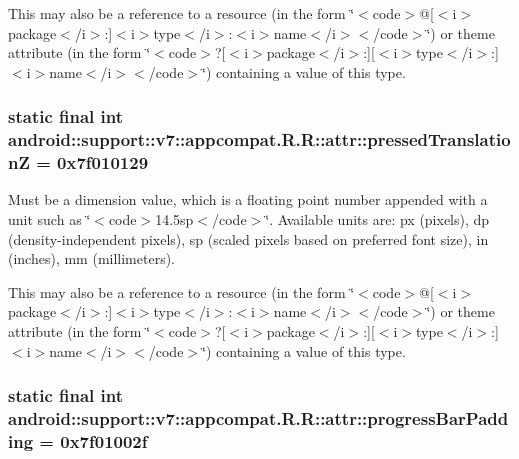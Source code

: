 This may also be a reference to a resource (in the form \char`\"{}$<$code$>$@\mbox{[}$<$i$>$package$<$/i$>$:\mbox{]}$<$i$>$type$<$/i$>$:$<$i$>$name$<$/i$>$$<$/code$>$\char`\"{}) or theme attribute (in the form \char`\"{}$<$code$>$?\mbox{[}$<$i$>$package$<$/i$>$:\mbox{]}\mbox{[}$<$i$>$type$<$/i$>$:\mbox{]}$<$i$>$name$<$/i$>$$<$/code$>$\char`\"{}) containing a value of this type. \hypertarget{classandroid_1_1support_1_1v7_1_1appcompat_1_1_r_1_1attr_dc8d8bde2998a0d5370e5a89f33754f8}{
\subsubsection[{pressedTranslationZ}]{\setlength{\rightskip}{0pt plus 5cm}static final int android::support::v7::appcompat.R.R::attr::pressedTranslationZ = 0x7f010129}}
\label{classandroid_1_1support_1_1v7_1_1appcompat_1_1_r_1_1attr_dc8d8bde2998a0d5370e5a89f33754f8}


Must be a dimension value, which is a floating point number appended with a unit such as \char`\"{}$<$code$>$14.5sp$<$/code$>$\char`\"{}. Available units are: px (pixels), dp (density-independent pixels), sp (scaled pixels based on preferred font size), in (inches), mm (millimeters). 

This may also be a reference to a resource (in the form \char`\"{}$<$code$>$@\mbox{[}$<$i$>$package$<$/i$>$:\mbox{]}$<$i$>$type$<$/i$>$:$<$i$>$name$<$/i$>$$<$/code$>$\char`\"{}) or theme attribute (in the form \char`\"{}$<$code$>$?\mbox{[}$<$i$>$package$<$/i$>$:\mbox{]}\mbox{[}$<$i$>$type$<$/i$>$:\mbox{]}$<$i$>$name$<$/i$>$$<$/code$>$\char`\"{}) containing a value of this type. \hypertarget{classandroid_1_1support_1_1v7_1_1appcompat_1_1_r_1_1attr_c39760cd6a812203a1ea1393c29f2c6c}{
\subsubsection[{progressBarPadding}]{\setlength{\rightskip}{0pt plus 5cm}static final int android::support::v7::appcompat.R.R::attr::progressBarPadding = 0x7f01002f}}
\label{classandroid_1_1support_1_1v7_1_1appcompat_1_1_r_1_1attr_c39760cd6a812203a1ea1393c29f2c6c}


